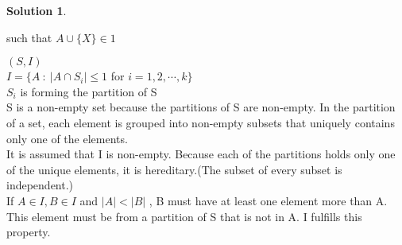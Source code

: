 \documentclass{article}
\theoremstyle{definition}
\newtheorem*{solution}{Solution}
\begin{document}
\begin{solution}
\begin{enumerate}
    such that $A\cup \{X\} \in 1$
\end{enumerate}
$(S,I)$\\
$I = \{A  \ : \ |A\cap S_i| \leq 1$ for $i = 1,2,\cdots,k\}$\\
$S_i$ is forming the partition of S\\
S is a non-empty set because the partitions of S are non-empty. In the partition of a set, each element is grouped into non-empty subsets that uniquely contains only one of the elements. \\
It is assumed that I is non-empty. Because each of the partitions holds only one of the unique elements, it is hereditary.(The subset of every subset is independent.)\\
If $A \in I, B \in I $ and $|A|<|B|$ , B must have at least one element more than A. This element must be from a partition of S that is not in A. I fulfills this property.\\













































































\end{solution}
\end{document}
